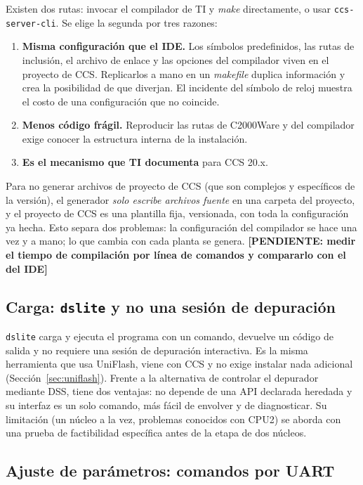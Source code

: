 \documentclass[12pt,letterpaper]{article}
\newcommand{\pendiente}[1]{\textbf{[PENDIENTE: #1]}}
\begin{document}
Existen dos rutas: invocar el compilador de TI y \textit{make} directamente, o usar \texttt{ccs-server-cli}. Se elige la segunda por tres razones:
\begin{enumerate}
    \item \textbf{Misma configuración que el IDE.} Los símbolos predefinidos, las rutas de inclusión, el archivo de enlace y las opciones del compilador viven en el proyecto de CCS. Replicarlos a mano en un \textit{makefile} duplica información y crea la posibilidad de que diverjan. El incidente del símbolo de reloj muestra el costo de una configuración que no coincide.
    \item \textbf{Menos código frágil.} Reproducir las rutas de C2000Ware y del compilador exige conocer la estructura interna de la instalación.
    \item \textbf{Es el mecanismo que TI documenta} para CCS 20.x.
\end{enumerate}
Para no generar archivos de proyecto de CCS (que son complejos y específicos de la versión), el generador \emph{solo escribe archivos fuente} en una carpeta del proyecto, y el proyecto de CCS es una plantilla fija, versionada, con toda la configuración ya hecha. Esto separa dos problemas: la configuración del compilador se hace una vez y a mano; lo que cambia con cada planta se genera. \pendiente{medir el tiempo de compilación por línea de comandos y compararlo con el del IDE}

\subsection{Carga: \texttt{dslite} y no una sesión de depuración}
\label{sec:dec_carga}

\texttt{dslite} carga y ejecuta el programa con un comando, devuelve un código de salida y no requiere una sesión de depuración interactiva. Es la misma herramienta que usa UniFlash, viene con CCS y no exige instalar nada adicional (Sección~\ref{sec:uniflash}). Frente a la alternativa de controlar el depurador mediante DSS, tiene dos ventajas: no depende de una API declarada heredada y su interfaz es un solo comando, más fácil de envolver y de diagnosticar. Su limitación (un núcleo a la vez, problemas conocidos con CPU2) se aborda con una prueba de factibilidad específica antes de la etapa de dos núcleos.

\subsection{Ajuste de parámetros: comandos por UART}
\label{sec:dec_parametros}
\end{document}
